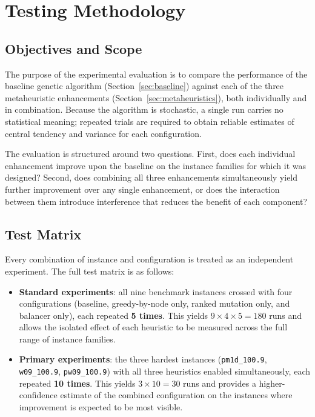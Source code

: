 \documentclass[12pt]{article}
\begin{document}
\section{Testing Methodology}
\label{sec:testing}

\subsection{Objectives and Scope}

The purpose of the experimental evaluation is to compare the performance of the
baseline genetic algorithm (Section~\ref{sec:baseline}) against each of the three
metaheuristic enhancements (Section~\ref{sec:metaheuristics}), both individually
and in combination.
Because the algorithm is stochastic, a single run carries no statistical meaning;
repeated trials are required to obtain reliable estimates of central tendency and
variance for each configuration.

The evaluation is structured around two questions.
First, does each individual enhancement improve upon the baseline on the instance
families for which it was designed?
Second, does combining all three enhancements simultaneously yield further
improvement over any single enhancement, or does the interaction between them
introduce interference that reduces the benefit of each component?

\subsection{Test Matrix}

Every combination of instance and configuration is treated as an independent
experiment.
The full test matrix is as follows:

\begin{itemize}
    \item \textbf{Standard experiments}: all nine benchmark instances crossed with
          four configurations (baseline, greedy-by-node only, ranked mutation
          only, and balancer only), each repeated \textbf{5 times}.
          This yields $9 \times 4 \times 5 = 180$ runs and allows the isolated
          effect of each heuristic to be measured across the full range of instance
          families.
    \item \textbf{Primary experiments}: the three hardest instances
          (\texttt{pm1d\_100.9}, \texttt{w09\_100.9}, \texttt{pw09\_100.9}) with
          all three heuristics enabled simultaneously, each repeated
          \textbf{10 times}.
          This yields $3 \times 10 = 30$ runs and provides a higher-confidence
          estimate of the combined configuration on the instances where
          improvement is expected to be most visible.
\end{itemize}
\end{document}
